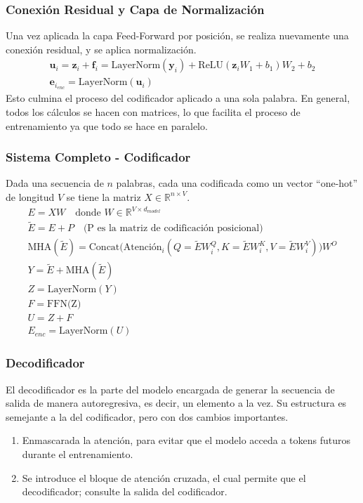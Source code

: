 \documentclass[12pt,letterpaper]{article}
\begin{document}
\subsubsection{Conexión Residual y Capa de Normalización}
Una vez aplicada la capa Feed-Forward por posición, se realiza nuevamente una conexión residual, y se aplica normalización. 
\begin{gather}
    \textbf{u}_i = \textbf{z}_i + \textbf{f}_i = \text{LayerNorm}(\textbf{y}_i) + \text{ReLU}(\textbf{z}_iW_1+b_1)W_2+b_2\\
    \textbf{e}_{i_{enc}} = \text{LayerNorm}(\textbf{u}_i)
\end{gather}
Esto culmina el proceso del codificador aplicado a una sola palabra. En general, todos los cálculos se hacen con matrices, lo que facilita el proceso de entrenamiento ya que todo se hace en paralelo. 

\subsubsection{Sistema Completo - Codificador}
Dada una secuencia de $n$ palabras, cada una codificada como un vector ``one-hot'' de longitud $V$ se tiene la matriz $X\in \mathbb{R}^{n\times V}$.
\begin{gather}
    E=XW \quad \text{donde} \,\,W \in \mathbb{R}^{V\times d_{model}}\\
    \tilde{E}=E+P \quad \text{(P es la matriz de codificación posicional)}\\
    \text{MHA}(\tilde{E})=\text{Concat}\big(\text{Atención}_i(Q=\tilde{E}W_i^Q,K=\tilde{E}W_i^K,V=\tilde{E}W_i^V)\big)W^O\\
    Y=\tilde{E}+\text{MHA}(\tilde{E})\\
    Z=\text{LayerNorm}(Y)\\
    F=\text{FFN(Z)}\\
    U = Z+F\\
    E_{enc} = \text{LayerNorm}(U)
\end{gather}

\subsubsection{Decodificador}
El decodificador es la parte del modelo encargada de generar la secuencia de salida de manera autoregresiva, es decir, un elemento a la vez. Su estructura es semejante a la del codificador, pero con dos cambios importantes.
\begin{enumerate}
    \item Enmascarada la atención, para evitar que el modelo acceda a tokens futuros durante el entrenamiento.
    
    \item Se introduce el bloque de atención cruzada, el cual permite que el decodificador; consulte la salida del codificador.
\end{enumerate}
\end{document}
